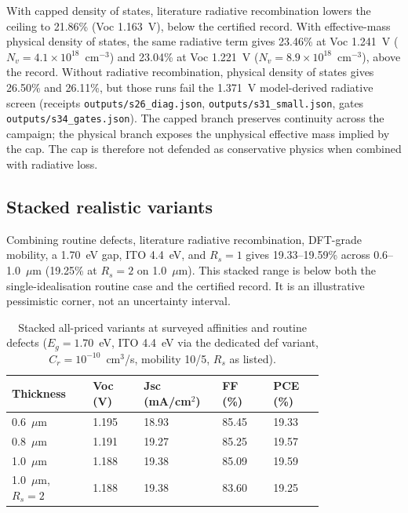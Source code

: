 \documentclass[11pt,a4paper]{article}
\begin{document}
With capped density of states, literature radiative recombination lowers the ceiling to 21.86\% (Voc 1.163~V), below the certified record. With effective-mass physical density of states, the same radiative term gives 23.46\% at Voc 1.241~V ($N_v=4.1\times10^{18}$~cm$^{-3}$) and 23.04\% at Voc 1.221~V ($N_v=8.9\times10^{18}$~cm$^{-3}$), above the record. Without radiative recombination, physical density of states gives 26.50\% and 26.11\%, but those runs fail the 1.371~V model-derived radiative screen (receipts \texttt{outputs/s26\_diag.json}, \texttt{outputs/s31\_small.json}, gates \texttt{outputs/s34\_gates.json}). The capped branch preserves continuity across the campaign; the physical branch exposes the unphysical effective mass implied by the cap. The cap is therefore not defended as conservative physics when combined with radiative loss.

\subsection{Stacked realistic variants}

Combining routine defects, literature radiative recombination, DFT-grade mobility, a 1.70~eV gap, ITO 4.4~eV, and $R_s=1$ gives 19.33--19.59\% across 0.6--1.0~$\mu$m (19.25\% at $R_s=2$ on 1.0~$\mu$m). This stacked range is below both the single-idealisation routine case and the certified record. It is an illustrative pessimistic corner, not an uncertainty interval.

\begin{table}[tbp]
\centering
\caption{Stacked all-priced variants at surveyed affinities and routine defects ($E_g=1.70$~eV, ITO 4.4~eV via the dedicated def variant, $C_r=10^{-10}$~cm$^3$/s, mobility 10/5, $R_s$ as listed).}
\label{tab:stack}
\small
\begingroup
\setlength{\tabcolsep}{4pt}
\begin{tabular}{|p{0.20\linewidth}|p{0.13\linewidth}|p{0.20\linewidth}|p{0.13\linewidth}|p{0.13\linewidth}|}
\hline\hline
Thickness & Voc (V) & Jsc (mA/cm$^2$) & FF (\%) & PCE (\%) \\
\hline
0.6~$\mu$m & 1.195 & 18.93 & 85.45 & 19.33 \\
0.8~$\mu$m & 1.191 & 19.27 & 85.25 & 19.57 \\
1.0~$\mu$m & 1.188 & 19.38 & 85.09 & 19.59 \\
1.0~$\mu$m, $R_s=2$ & 1.188 & 19.38 & 83.60 & 19.25 \\
\hline\hline
\end{tabular}
\endgroup
\end{table}
\end{document}
